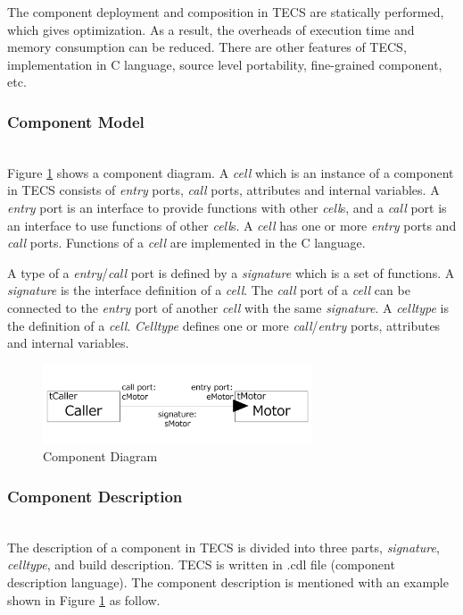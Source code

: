\documentclass[conference,compsoc]{IEEEtran}
\begin{document}
The component deployment and composition in TECS are statically performed, which gives optimization.
As a result, the overheads of execution time and memory consumption can be reduced.
There are other features of TECS, implementation in C language, source level portability, fine-grained component, etc.

\subsubsection{Component Model}\mbox{}\\

Figure \ref{fig:component} shows a component diagram.
A {\it cell} which is an instance of a component in TECS consists of {\it entry} ports, {\it call} ports, attributes and internal variables.
A {\it entry} port is an interface to provide functions with other {\it cell}s, and a {\it call} port is an interface to use functions of other {\it cell}s.
A {\it cell} has one or more {\it entry} ports and {\it call} ports.
Functions of a {\it cell} are implemented in the C language.

A type of a {\it entry}/{\it call} port is defined by a {\it signature} which is a set of functions.
A {\it signature} is the interface definition of a {\it cell}.
The {\it call} port of a {\it cell} can be connected to the {\it entry} port of another {\it cell} with the same {\it signature}.
A {\it celltype} is the definition of a {\it cell}.
{\it Celltype} defines one or more {\it call}/{\it entry} ports, attributes and internal variables.

\begin{figure}[t]
    \centering
    \includegraphics[width=8cm,clip]{figure/component_diagram.pdf}
    \caption{Component Diagram}
    \label{fig:component}
\end{figure}

\subsubsection{Component Description}\mbox{}\\

The description of a component in TECS is divided into three parts, {\it signature}, {\it celltype}, and build description.
TECS is written in .cdl file (component description language).
The component description is mentioned with an example shown in Figure \ref{fig:component} as follow.
\end{document}
